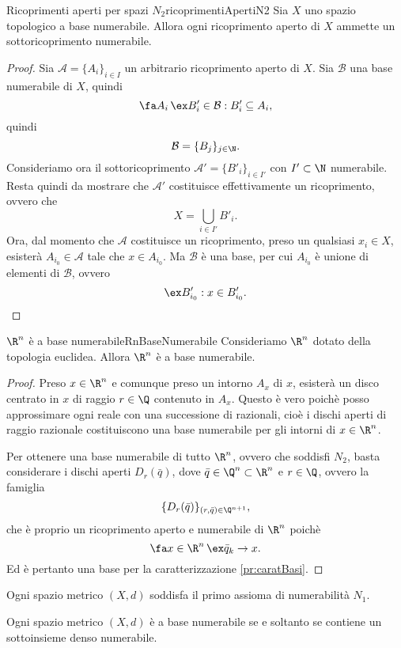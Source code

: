 \begin{prop}{Ricoprimenti aperti per spazi \(N_2\)}{ricoprimentiApertiN2}
	Sia \(X\) uno spazio topologico a base numerabile.
	Allora ogni ricoprimento aperto di \(X\) ammette un sottoricoprimento numerabile.
\end{prop}

\begin{proof}
	Sia \(\mathcal{A}=\{A_i\}_{i\in I}\) un arbitrario ricoprimento aperto di \(X\).
	Sia \(\mathcal{B}\) una base numerabile di \(X\), quindi
	\[
		\fa A_i\,\ex B'_i\in\mathcal{B}:B'_i\subseteq A_i,
	\]
	quindi
	\[
		\mathcal{B}=\{B_j\}_{j\in\N}.
	\]
	Consideriamo ora il sottoricoprimento \(\mathcal{A}'=\{B'_i\}_{i\in I'}\) con \(I'\subset\N\) numerabile.
	Resta quindi da mostrare che \(\mathcal{A}'\) costituisce effettivamente un ricoprimento, ovvero che
	\[
		X=\bigcup_{i\in I'}B'_i.
	\]
	Ora, dal momento che \(\mathcal{A}\) costituisce un ricoprimento, preso un qualsiasi \(x_i\in X\), esisterà \(A_{i_0}\in \mathcal{A}\) tale che \(x\in A_{i_0}\).
	Ma \(\mathcal{B}\) è una base, per cui \(A_{i_0}\) è unione di elementi di \(\mathcal{B}\), ovvero
	\[
		\ex B'_{i_0}:x\in B'_{i_0}.\qedhere
	\]
\end{proof}

\begin{prop}{\(\R^n\) è a base numerabile}{RnBaseNumerabile}
	Consideriamo \(\R^n\) dotato della topologia euclidea.
	Allora \(\R^n\) è a base numerabile.
\end{prop}

\begin{proof}
	Preso \(x\in\R^n\) e comunque preso un intorno \(A_x\) di \(x\), esisterà un disco centrato in \(x\) di raggio \(r\in\Q\) contenuto in \(A_x\).
	Questo è vero poichè posso approssimare ogni reale con una successione di razionali, cioè i dischi aperti di raggio razionale costituiscono una base numerabile per gli intorni di \(x\in\R^n\).

	Per ottenere una base numerabile di tutto \(\R^n\), ovvero che soddisfi \(N_2\), basta considerare i dischi aperti \(D_r(\bar{q})\), dove \(\bar{q}\in\Q^n\subset\R^n\) e \(r\in\Q\), ovvero la famiglia
	\[
		\{D_r(\bar{q})\}_{(r,\bar{q})\in\Q^{n+1}},
	\]
	che è proprio un ricoprimento aperto e numerabile di \(\R^n\) poichè
	\[
		\fa x\in\R^n\,\ex\bar{q}_k\to x.
	\]
	Ed è pertanto una base per la caratterizzazione \ref{pr:caratBasi}.
\end{proof}

\begin{oss}
	Ogni spazio metrico \((X,d)\) soddisfa il primo assioma di numerabilità \(N_1\).
\end{oss}

\begin{oss}
	Ogni spazio metrico \((X,d)\) è a base numerabile se e soltanto se contiene un sottoinsieme denso numerabile.
\end{oss}